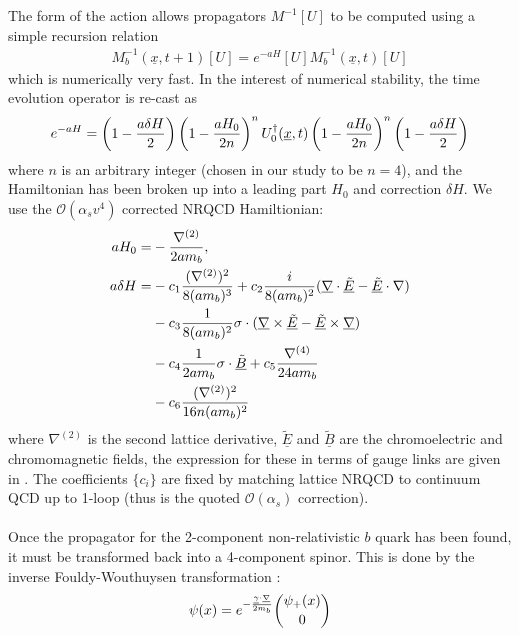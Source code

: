 \documentclass[a4paper,10pt]{article}
\numberwithin{equation}{section}
\begin{document}
The form of the action allows propagators $M^{-1}[U]$ to be computed using a simple recursion relation
\begin{align}
	M_b^{-1}(\underline{x},t+1)[U] = e^{-aH}[U] M^{-1}_b(\underline{x},t)[U] 
\end{align}
which is numerically very fast. In the interest of numerical stability, the time evolution operator is re-cast as
\begin{align}
	e^{-aH} = \left(1 - {a\delta H\over 2}\right)\left(1-{aH_0\over 2 n}\right)^n U_0^{\dagger}(\underline{x},t) \left(1 - {aH_0\over 2n}\right)^n \left(1-{a\delta H\over 2}\right)
\end{align}
where $n$ is an arbitrary integer (chosen in our study to be $n=4$), and the Hamiltonian has been broken up into a leading part $H_0$ and correction $\delta H$. We use the $\mathcal{O}(\alpha_s v^4)$ corrected NRQCD Hamiltionian:
\begin{align}
	aH_0 =& - {\nabla^{(2)}\over 2am_b} , \\
	\nonumber
	a\delta H =& - c_1 {(\nabla^{(2)})^2 \over 8 (am_b)^3} + c_2{ i\over 8(am_b)^2} ( \underline{\nabla}\cdot \underline{\tilde{E}} - \underline{\tilde{E}}\cdot \nabla) \\
	\nonumber
	& - c_3 {1\over 8(am_b)^2} \sigma\cdot ( \underline{\nabla}\times\underline{\tilde{E}} - \underline{\tilde{E}}\times\underline{\nabla}) \\
	\nonumber
	& - c_4 {1\over 2am_b} \sigma\cdot \underline{\tilde{B}} + c_5 {\nabla^{(4)}\over 24 am_b} \\
	& - c_6 {(\nabla^{(2)})^2\over 16n (am_b)^2}
\end{align}
where $\nabla^{(2)}$ is the second lattice derivative, $\underline{\tilde{E}}$ and $\underline{\tilde{B}}$ are the chromoelectric and chromomagnetic fields, the expression for these in terms of gauge links are given in \cite{Gray:2005ur}. The coefficients $\{c_i\}$ are fixed by matching lattice NRQCD to continuum QCD up to 1-loop (thus is the quoted $\mathcal{O}(\alpha_s)$ correction).
\\ \\
Once the propagator for the 2-component non-relativistic $b$ quark has been found, it must be transformed back into a 4-component spinor. This is done by the inverse Fouldy-Wouthuysen transformation \cite{PhysRev.78.29}:
\begin{align}
	\psi(x) = e^{-{\underline{\gamma}\cdot\underline{\nabla}\over 2m_b}}\binom{\psi_+(x)}{0}
	\label{eq:FoldyWoldy}
\end{align}
\end{document}

